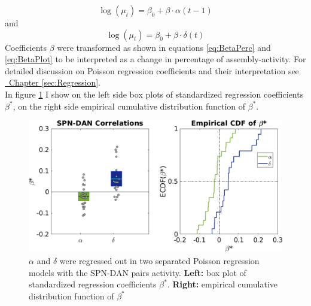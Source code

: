 \begin{equation*}
    \log(\mu_t)=\beta_0+\beta\cdot\alpha(t-1)
\end{equation*}
and 
\begin{equation*}
    \log(\mu_t)=\beta_0+\beta\cdot\delta(t)
\end{equation*}
Coefficients $\beta$ were transformed as shown in equations \ref{eq:BetaPerc} and \ref{eq:BetaPlot} to be interpreted as a change in percentage of assembly-activity. For detailed discussion on Poisson regression coefficients and their interpretation see \hyperref[sec:Regression]{~Chapter \ref*{sec:Regression}}.\\
In figure \ref{fig:RL_alphadelta} I show on the left side box plots of standardized regression coefficients $\beta^*$, on the right side empirical cumulative distribution function of $\beta^*$.\\
\begin{figure}
   \centering
    \includegraphics[scale=0.45]{figures/AlphaAndDeltaPavSPN3.png}
    \caption{$\alpha$ and $\delta$ were regressed out in two separated Poisson regression models with the SPN-DAN pairs activity. \textbf{Left:} box plot of standardized regression coefficients $\beta^*$. \textbf{Right:} empirical cumulative distribution function of $\beta^*$}
    \label{fig:RL_alphadelta}
\end{figure}
